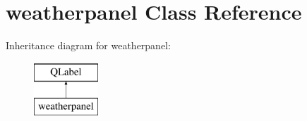 \hypertarget{classweatherpanel}{}\section{weatherpanel Class Reference}
\label{classweatherpanel}
Inheritance diagram for weatherpanel\+:\begin{figure}[H]
\begin{center}
\leavevmode
\includegraphics[height=2.000000cm]{classweatherpanel}
\end{center}
\end{figure}
